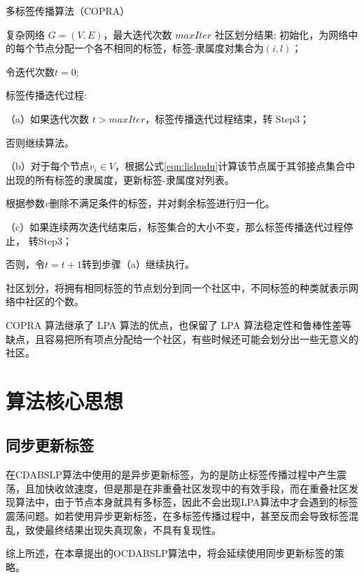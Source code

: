 \begin{algorithm}[htb]  
  \caption{多标签传播算法（COPRA）}  
  \label{alg:COPRA}  
  \begin{algorithmic}[1]  
    \Require  
    复杂网络 $G = (V, E)$，最大迭代次数 $maxIter$   
    \Ensure  
      社区划分结果;  
    \State 初始化，为网络中的每个节点分配一个各不相同的标签，标签-隶属度对集合为${(i,l)}$；
    
          令迭代次数$t=0$;  

    \State 标签传播迭代过程:

    （a）如果迭代次数 $t > maxIter$，标签传播迭代过程结束，转 Step3；
    
    否则继续算法。 

    （b）对于每个节点$v_i\in V$，根据公式\ref{eqn:lishudu}计算该节点属于其邻接点集合中出现的所有标签的隶属度，更新标签-隶属度对列表。
    
    根据参数$v$删除不满足条件的标签，并对剩余标签进行归一化。 
     
    （c）如果连续两次迭代结束后，标签集合的大小不变，那么标签传播迭代过程停止，
    转Step3；
    
    否则，令$t = t+1$转到步骤（a）继续执行。

    \State 社区划分，将拥有相同标签的节点划分到同一个社区中，不同标签的种类就表示网络中社区的个数。
  \end{algorithmic}  
\end{algorithm} 

COPRA 算法继承了 LPA 算法的优点，也保留了 LPA 算法稳定性和鲁棒性差等缺点，且容易把所有项点分配给一个社区，有些时候还可能会划分出一些无意义的社区。

\section{算法核心思想}

\subsection{同步更新标签}

在CDABSLP算法中使用的是异步更新标签，为的是防止标签传播过程中产生震荡，且加快收敛速度，但是那是在非重叠社区发现中的有效手段，而在重叠社区发现算法中，由于节点本身就具有多标签，因此不会出现LPA算法中才会遇到的标签震荡问题。如若使用异步更新标签，在多标签传播过程中，甚至反而会导致标签混乱，致使最终结果出现失真现象，不具有复现性。

综上所述，在本章提出的OCDABSLP算法中，将会延续使用同步更新标签的策略。

